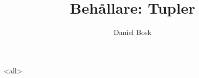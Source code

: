 \documentclass[ignoreframetext]{beamer}
\begin{document}
\title{%
  Behållare: Tupler
}
\author{Daniel Bosk}

\begin{frame}
  \maketitle
\end{frame}

\mode<all>

\mode*
%

\end{document}
